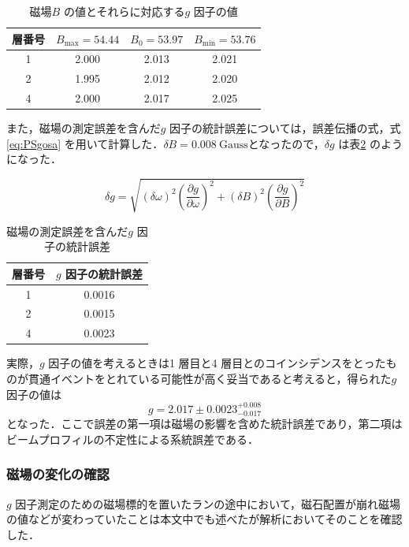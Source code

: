 \begin{table}[h]
	\centering
	\caption{磁場$B$ の値とそれらに対応する$g$ 因子の値}
	\begin{tabular}{cccc}\toprule
	層番号 & $B_{\mathrm{max}} = 54.44$ & $B_{0} = 53.97$ & $B_{\mathrm{min}} = 53.76$ \\ \midrule
	1 & 2.000 & 2.013 & 2.021 \\
	2 & 1.995 & 2.012 & 2.020 \\
	4 & 2.000 & 2.017 & 2.025 \\ \bottomrule 
	\end{tabular}\label{tab:PSgSysErr}
\end{table}%

また，磁場の測定誤差を含んだ$g$ 因子の統計誤差については，誤差伝播の式，式\eqref{eq:PSgosa} を用いて計算した．$\delta B = 0.008~\mathrm{Gauss}$となったので，$\delta g$ は表\ref{tab:PSgStatErr} のようになった．

\begin{equation}
\delta g = \sqrt{\left(\delta\omega\right)^{2}\left(\frac{\partial g}{\partial\omega}\right)^{2} + \left(\delta B\right)^{2}\left(\frac{\partial g}{\partial B}\right)^{2}}
\label{eq:PSgosa}
\end{equation}%

\begin{table}
	\centering
	\caption{磁場の測定誤差を含んだ$g$ 因子の統計誤差}
	\begin{tabular}{cc}\toprule
	層番号 & $g$ 因子の統計誤差\\ \midrule
	1 & 0.0016 \\ 
	2 & 0.0015 \\
	4 & 0.0023 \\ \bottomrule
	\end{tabular}\label{tab:PSgStatErr}
\end{table}%

実際，$g$ 因子の値を考えるときは1 層目と4 層目とのコインシデンスをとったものが貫通イベントをとれている可能性が高く妥当であると考えると，得られた$g$ 因子の値は
\[g = 2.017 \pm 0.0023 ^{+0.008}_{-0.017}\]
となった．ここで誤差の第一項は磁場の影響を含めた統計誤差であり，第二項はビームプロフィルの不定性による系統誤差である．

\subsubsection{磁場の変化の確認}
\label{subsubsec:PSMagChangeCheck}
$g$ 因子測定のための磁場標的を置いたランの途中において，磁石配置が崩れ磁場の値などが変わっていたことは本文中でも述べたが解析においてそのことを確認した．

